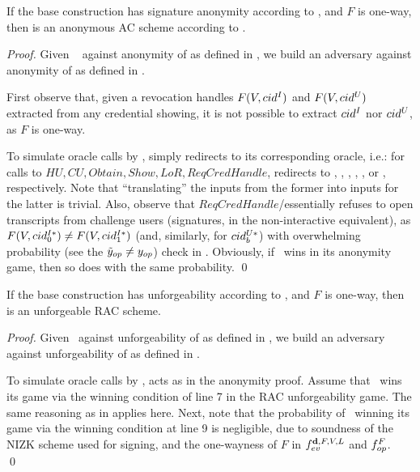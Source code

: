 \begin{theorem}
  \label{thm:anon-cuasrac}
  If the base \CUASGen construction has signature anonymity according to
  , and $F$ is one-way, then \CUASAC is an
  anonymous AC scheme according to \cite{fhs19}.
\end{theorem}

\begin{proof}
  Given \adv~ against anonymity of \CUASRAC as defined in
  , we build an adversary \advB against anonymity of
  \CUASGen as defined in .

  First observe that, given a revocation handles $F(V,cid^I)$ and $F(V,cid^U)$
  extracted from any credential showing, it is not possible to extract $cid^I$
  nor $cid^U$, as $F$ is one-way.
  
  To simulate oracle calls by \adv, \advB simply redirects to its corresponding
  oracle, i.e.: for calls to $HU,CU,Obtain,Show,LoR,ReqCredHandle$, \advB
  redirects to \HUGEN, \CUGEN, \OBTAIN, \SIGN, \CHALb, or \OPEN, respectively.
  Note that ``translating'' the inputs from the former into inputs for the
  latter is trivial. Also, observe that $ReqCredHandle$/\OPEN essentially
  refuses to open transcripts from challenge users (signatures, in the
  non-interactive equivalent), as $F(V,cid^{I*}_0) \neq F(V,cid^{I*}_1)$ (and,
  similarly, for $cid^{U*}_b$) with overwhelming probability (see the $\tilde{y}_{op}
  \neq y_{op}$) check in . Obviously, if \adv~wins in its
  anonymity game, then so does \advB with the same probability.
  \qed
\end{proof}

\begin{theorem}
  If the base \CUASGen construction has unforgeability according to
  , and $F$ is one-way, then
  \CUASRAC is an unforgeable RAC scheme.
\end{theorem}

\begin{proof}
  Given \adv~against unforgeability of \CUASRAC as defined in
  , we build an adversary \advB against unforgeability of
  \CUASGen as defined in .

  To simulate oracle calls by \adv, \advB acts as in the anonymity proof. Assume
  that \adv~wins its game via the winning condition of line 7 in the RAC
  unforgeability game. The same reasoning as in \CUASAC applies here. Next, note
  that the probability of \adv~winning its game via the winning condition at
  line 9 is negligible, due to soundness of the NIZK scheme used for signing,
  and the one-wayness of $F$ in $f_{ev}^{\mathbf{d},F,V,L}$ and $f_{op}^{F}$.
  \qed
\end{proof}

